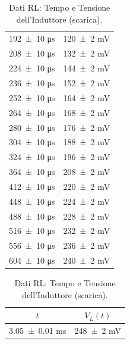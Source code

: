 \documentclass[a4paper]{article}
\begin{document}
\begin{appendices}
\begin{table}[htbp]
\begin{minipage}{0.48\textwidth}
\begin{tabular}{|c|c|}
        \num{192 \pm 10} \si{\micro\second} & \num{120  \pm 2} \si{\milli\volt} \\
        \num{208 \pm 10} \si{\micro\second} & \num{132  \pm 2} \si{\milli\volt} \\
        \num{224 \pm 10} \si{\micro\second} & \num{144  \pm 2} \si{\milli\volt} \\
        \num{236 \pm 10} \si{\micro\second} & \num{152  \pm 2} \si{\milli\volt} \\
        \num{252 \pm 10} \si{\micro\second} & \num{164  \pm 2} \si{\milli\volt} \\
        \num{264 \pm 10} \si{\micro\second} & \num{168  \pm 2} \si{\milli\volt} \\
        \num{280 \pm 10} \si{\micro\second} & \num{176  \pm 2} \si{\milli\volt} \\
        \num{304 \pm 10} \si{\micro\second} & \num{188  \pm 2} \si{\milli\volt} \\
        \num{324 \pm 10} \si{\micro\second} & \num{196  \pm 2} \si{\milli\volt} \\
        \num{364 \pm 10} \si{\micro\second} & \num{208  \pm 2} \si{\milli\volt} \\
        \num{412 \pm 10} \si{\micro\second} & \num{220  \pm 2} \si{\milli\volt} \\
        \num{448 \pm 10} \si{\micro\second} & \num{224  \pm 2} \si{\milli\volt} \\
        \num{488 \pm 10} \si{\micro\second} & \num{228  \pm 2} \si{\milli\volt} \\
        \num{516 \pm 10} \si{\micro\second} & \num{232  \pm 2} \si{\milli\volt} \\
        \num{556 \pm 10} \si{\micro\second} & \num{236  \pm 2} \si{\milli\volt} \\
        \num{604 \pm 10} \si{\micro\second} & \num{240  \pm 2} \si{\milli\volt} \\
        \hline
        \end{tabular}
        \caption{Dati RL: Tempo e Tensione dell'Induttore (scarica).}
        \label{tab:rl_data_scarica_l}
    \end{minipage}\hfill
    \begin{minipage}{0.48\textwidth} %
        \centering\small
        \begin{tabular}{|c|c|}
        \hline
         \( t \) & \( V_L(t) \) \\ %
        \hline\hline
        \num{3.05  \pm 0.01} \si{\milli\second} & \num{248 \pm 2} \si{\milli\volt} \\

\end{tabular}
\end{minipage}
\end{table}
\end{appendices}
\end{document}
